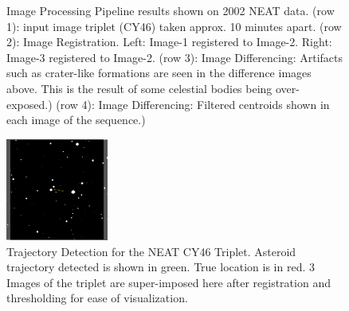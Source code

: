 \begin{figure}[h]
\begin{center}
\end{center}
\vspace{-0.7cm}
\caption[caption]{Image Processing Pipeline results shown on 2002 NEAT data. 
(row 1):  input image triplet (CY46) taken approx. 10 minutes apart. 
(row 2): Image Registration. Left: Image-1 registered to Image-2. Right: Image-3 registered to Image-2. 
(row 3): Image Differencing: Artifacts such as crater-like formations are seen in the difference images above. This is the result of some celestial bodies being over-exposed.) 
(row 4): Image Differencing: Filtered centroids shown in each image of the sequence.)}
\label{IPP_NEAT_Layout1}
\end{figure}

\begin{figure}[!]
\vspace{-0.25cm}
\begin{center}
\includegraphics[width=0.3\textwidth]{Figures/NEATLines_LogicalImg.pdf}
\end{center}
\vspace{-0.7cm}
\caption{Trajectory Detection for the NEAT CY46 Triplet. Asteroid trajectory detected is shown in green. True location is in red. 3 Images of the triplet are super-imposed here after registration and thresholding for ease of visualization.}
\label{fig:IPP_NEAT_Trajectory}
\vspace{-0.3cm}
\end{figure}


